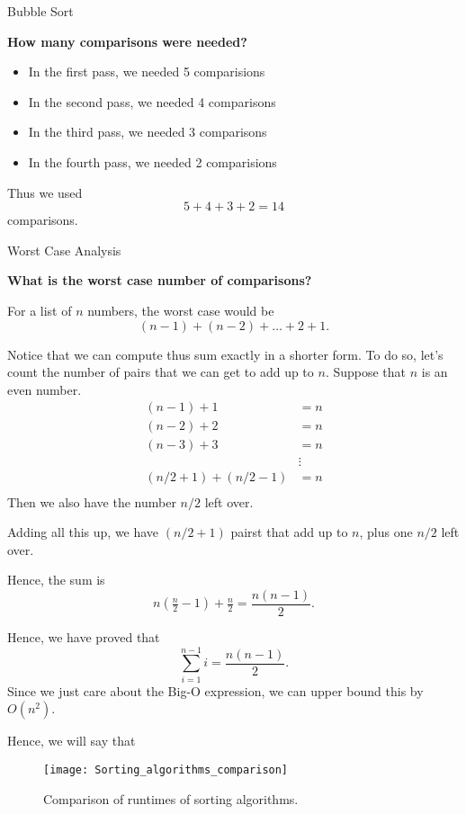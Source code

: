 \begin{examplewithoutcode}{Bubble Sort}{}{}
 
 \textbf{How many comparisons were needed?}\\
 \begin{itemize}
 \item  In the first pass, we needed 5 comparisions
 \item  In the second pass, we needed 4 comparisons
 \item In the third pass, we needed 3 comparisons
 \item In the fourth pass, we needed 2 comparisions
 \end{itemize}
 Thus we used
 $$
 5 + 4 + 3 + 2 = 14 
 $$
 comparisons.
 \end{examplewithoutcode}
 
 \begin{examplewithoutcode}{Worst Case Analysis}{}{}

\textbf{What is the worst case number of comparisons?}

For a list of $n$ numbers, the worst case would be 
$$
(n-1) + (n-2) + \dots + 2 + 1.
$$

Notice that we can compute thus sum exactly in a shorter form.   To do so, let's count the number of pairs that we can get to add up to $n$.  Suppose that $n$ is an even number.
\begin{align*}
(n-1) + 1 &= n\\
(n-2) + 2 & = n\\
(n-3) + 3 & = n\\
&\vdots\\
(n/2 + 1) + (n/2 -1) &= n\\
\end{align*}
Then we also have the number $n/2$ left over.

Adding all this up, we have $(n/2 + 1)$ pairst that add up to $n$, plus one $n/2$ left over. 

Hence, the sum is 
$$
n(\tfrac{n}{2}-1) + \tfrac{n}{2} = \frac{n(n-1)}{2}.
$$

Hence, we have proved that 
$$
\sum_{i=1}^{n-1} i = \frac{n(n-1)}{2}.
$$
Since we just care about the Big-O expression, we can upper bound this by $O(n^2)$.

Hence, we will say that 
\end{examplewithoutcode}










\begin{figure}[h]
\texttt{[image: Sorting\_algorithms\_comparison]}
\caption{Comparison of runtimes of sorting algorithms.}
\end{figure}

